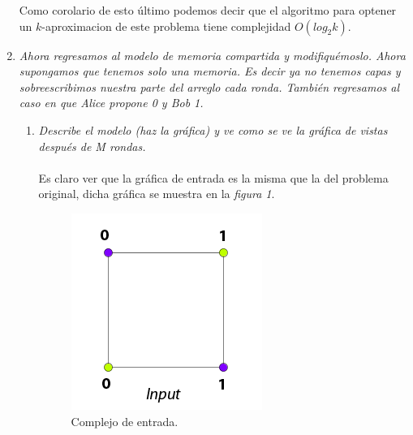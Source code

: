 \documentclass{article}
\begin{document}
\begin{enumerate}
  Como corolario de esto último podemos decir que el algoritmo para optener
  un $k$-aproximacion de este problema tiene complejidad $O(log_2 k)$. 

  
  
\item{
    
    \textsl{
    Ahora regresamos al modelo de memoria compartida y modifiquémoslo. Ahora 
    supongamos que tenemos solo una memoria. Es decir ya no tenemos capas y
    sobreescribimos nuestra parte del arreglo cada ronda. También regresamos
    al caso en que Alice propone 0 y Bob 1.}
    \begin{enumerate}
      
    \item{\textsl{Describe el modelo (haz la gráfica) y ve como se ve la gráfica de 
        vistas después de M rondas.}\\
      \\
      Es claro ver que la gráfica de entrada es la misma que la del problema original,
      dicha gráfica se muestra en la \textit{figura 1}.\\
      
      \begin{figure}
        \centering
        \includegraphics[scale=0.6]{3a_input.png}
        \caption{Complejo de entrada.}
      \end{figure}
      
}
\end{enumerate}}
\end{enumerate}
\end{document}

